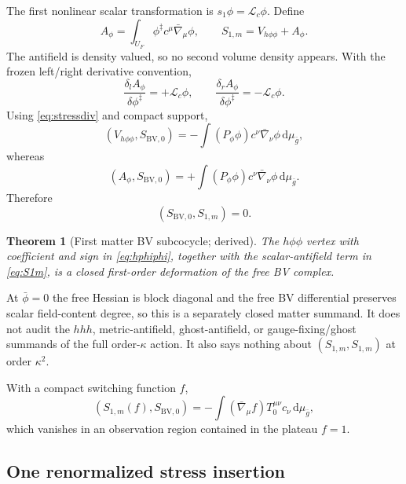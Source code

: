 \documentclass[11pt]{article}
\newtheorem{theorem}{Theorem}[section]
\theoremstyle{definition}
\theoremstyle{remark}
\newcommand{\U}{U_{F}}
\newcommand{\gbar}{\bar g}
\newcommand{\dd}{\mathrm d}
\begin{document}
The first nonlinear scalar transformation is $s_1\phi=\mathcal L_c\phi$.  Define
\begin{equation}
 A_\phi=\int_{\U}\phi^\ddagger c^\mu\bar\nabla_\mu\phi,
 \qquad
 S_{1,m}=V_{h\phi\phi}+A_\phi.
 \label{eq:S1m}
\end{equation}
The antifield is density valued, so no second volume density appears.  With the frozen
left/right derivative convention,
\begin{equation}
 \frac{\delta_lA_\phi}{\delta\phi^\ddagger}=+\mathcal L_c\phi,
 \qquad
 \frac{\delta_rA_\phi}{\delta\phi^\ddagger}=-\mathcal L_c\phi.
\end{equation}
Using \cref{eq:stressdiv} and compact support,
\begin{equation}
 (V_{h\phi\phi},S_{\mathrm{BV},0})
 =-\int(P_\phi\phi)c^\nu\bar\nabla_\nu\phi\,\dd\mu_{\gbar},
\end{equation}
whereas
\begin{equation}
 (A_\phi,S_{\mathrm{BV},0})
 =+\int(P_\phi\phi)c^\nu\bar\nabla_\nu\phi\,\dd\mu_{\gbar}.
\end{equation}
Therefore
\begin{equation}
 (S_{\mathrm{BV},0},S_{1,m})=0.
 \label{eq:mattercocycle}
\end{equation}

\begin{theorem}[First matter BV subcocycle; derived]
The $h\phi\phi$ vertex with coefficient and sign in \cref{eq:hphiphi}, together with
the scalar-antifield term in \cref{eq:S1m}, is a closed first-order deformation of the
free BV complex.
\end{theorem}

At $\bar\phi=0$ the free Hessian is block diagonal and the free BV differential
preserves scalar field-content degree, so this is a separately closed matter summand.
It does not audit the $hhh$, metric-antifield, ghost-antifield, or gauge-fixing/ghost
summands of the full order-$\kappa$ action.  It also says nothing about
$(S_{1,m},S_{1,m})$ at order $\kappa^2$.

With a compact switching function $f$,
\begin{equation}
 (S_{1,m}(f),S_{\mathrm{BV},0})
 =-\int(\bar\nabla_\mu f)T_0^{\mu\nu}c_\nu\,\dd\mu_{\gbar},
\end{equation}
which vanishes in an observation region contained in the plateau $f=1$.

\subsection{One renormalized stress insertion}
\end{document}
